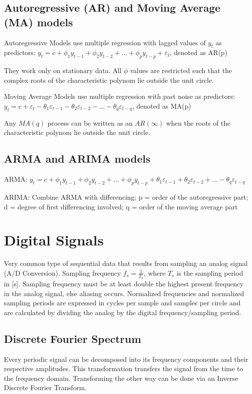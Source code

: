\documentclass[10pt, a4paper]{article}
\begin{document}
\subsection{Autoregressive (AR) and Moving Average (MA) models}
Autoregressive Models use multiple regression with lagged values of $ y_t $ as predictors:
$ y_t = c + \phi_1 y_{t-1} + \phi_2 y_{t-2} + \ldots + \phi_p y_{t-p} + \varepsilon_t $, denoted as AR(p)

They work only on stationary data. All $ \phi $ values are restricted such that the complex roots of the characteristic polynom lie outside the unit circle.

Moving Average Models use multiple regression with past noise as predictors:
$ y_t = c + \varepsilon_t - \theta_1 \varepsilon_{t-1} - \theta_2 \varepsilon_{t-2} - \ldots - \theta_q \varepsilon_{t-q} $, denoted as MA(p)

Any $ MA(q) $ process can be written as an $ AR(\infty) $ when the roots of the characteristic polynom lie outside the unit circle.

\subsection{ARMA and ARIMA models}
ARMA: $ y_t = c + \phi_1 y_{t-1} + \phi_2 y_{t-2} + \ldots + \phi_p y_{t-p} + \theta_1 \varepsilon_{t-1} + \theta_2 \varepsilon_{t-2} + \ldots - \theta_q \varepsilon_{t-q} $

ARIMA: Combine ARMA with differencing; p = order of the autoregressive part; d = degree of first differencing involved; q = order of the moving average part


\section{Digital Signals}
Very common type of sequential data that results from sampling an analog signal (A/D Conversion).
Sampling frequency $ f_s = \frac{1}{T_s} $, where $ T_s $ is the sampling period in [s]. Sampling frequency must be at least double the highest present
frequency in the analog signal, else aliasing occurs.
Normalized frequencies and normalized sampling periods are expressed in cycles per sample and samples per circle
and are calculated by dividing the analog by the digital frequency/sampling period.

\subsection{Discrete Fourier Spectrum}
Every periodic signal can be decomposed into its frequency components and their respective amplitudes.
This transformation transfers the signal from the time to the frequency domain.
Transforming the other way can be done via an Inverse Discrete Fourier Transform.
\end{document}
